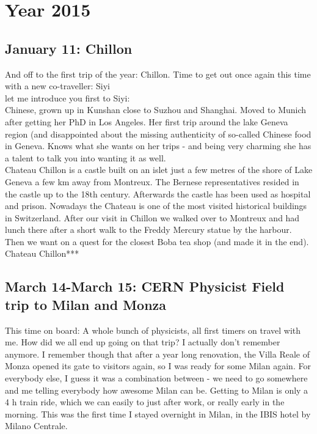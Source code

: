 \chapter{Year 2015}
\label{2015}

\section{January 11: Chillon}
\label{2015:Chillon}

And off to the first trip of the year: Chillon. Time to get out once again this time with a new co-traveller: Siyi\\

let me introduce you first to Siyi:\\
Chinese, grown up in Kunshan close to Suzhou and Shanghai. Moved to Munich after getting her PhD in Los Angeles. Her first trip around the lake Geneva region (and disappointed about the missing authenticity of so-called Chinese food in Geneva. Knows what she wants on her trips - and being very charming she has a talent to talk you into wanting it as well.\\

Chateau Chillon is a castle built on an islet just a few metres of the shore of Lake Geneva a few km away from Montreux. The Bernese representatives resided in the castle up to the 18th century. Afterwards the castle has been used as hospital and prison. Nowadays the Chateau is one of the most visited historical buildings in Switzerland. After our visit in Chillon we walked over to Montreux and had lunch there after a short walk to the Freddy Mercury statue by the harbour. Then we want on a quest for the closest Boba tea shop (and made it in the end).\\

Chateau Chillon***

\section{March 14-March 15: CERN Physicist Field trip to Milan and Monza}
\label{2015:Milan}

This time on board: A whole bunch of physicists, all first timers on travel with me. How did we all end up going on that trip? I actually don't remember anymore. I remember though that after a year long renovation, the Villa Reale of Monza opened its gate to visitors again, so I was ready for some Milan again. For everybody else,  I guess it was a combination between - we need to go somewhere and me telling everybody how awesome Milan can be. Getting to Milan is only a 4 h train ride, which we can easily to just after work, or really early in the morning. This was the first time I stayed overnight in Milan, in the IBIS hotel by Milano Centrale.\\

